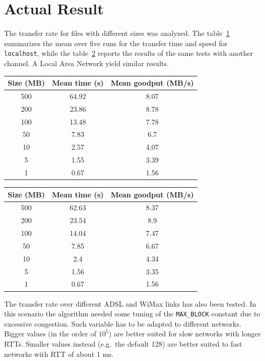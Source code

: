 \documentclass[10pt,twocolumn]{article}
\begin{document}
\section{Actual Result}
The transfer rate for files with different sizes was analyzed. The
table~\ref{table:ourChannel} summarizes the mean over five runs for the transfer time and speed for
\texttt{localhost}, while the table~\ref{table:anotherChannel} reports the results of the same tests with another channel. A Local Area Network yield similar results.
\begin{table}[h]
\centering
\begin{tabular}{|c|c|c|}
	Size (MB) & Mean time (s) & Mean goodput (MB/s)\\ \hline
  500       & 64.92    & 8.07  \\
  200       & 23.86    & 8.78  \\
	100       & 13.48    & 7.78  \\
	50        & 7.83     & 6.7 \\
	10        & 2.57     & 4.07 \\
	5         & 1.55     & 3.39  \\
	1         & 0.67     & 1.56  \\
\end{tabular}
\label{table:ourChannel}
\end{table}

\begin{table}[h]
\centering
\begin{tabular}{|c|c|c|}
  Size (MB) & Mean time (s) & Mean goodput (MB/s)\\ \hline
  500       & 62.63    & 8.37  \\
  200       & 23.54    & 8.9  \\
  100       & 14.04    & 7.47  \\
  50        & 7.85     & 6.67 \\
  10        & 2.4      & 4.34 \\
  5         & 1.56     & 3.35 \\
  1         & 0.67     & 1.56 \\

\end{tabular}
\label{table:anotherChannel}
\end{table}

The transfer rate over different ADSL and WiMax links has also been tested. In
this scenario the algorithm needed some tuning of the \texttt{MAX\_BLOCK}
constant due to excessive congestion. Such variable has to be adapted to
different networks. Bigger values (in the order of $10^5$) are better suited
for slow networks with longer RTTs. Smaller values instead (e.g.\ the default
128) are better suited to fast networks with RTT of about 1 ms.
\end{document}

